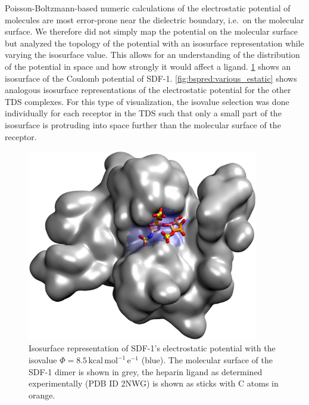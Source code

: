Poisson-Boltzmann-based numeric calculations of the electrostatic potential of
molecules are most error-prone near the dielectric boundary, i.e.\ on the
molecular surface. We therefore did not simply map the potential on the
molecular surface but analyzed the topology of the potential with an isosurface
representation while varying the isosurface value. This allows for an
understanding  of the distribution of the potential in space and how strongly it
would affect a ligand. \cref{fig:bspred:sdf1_estatic} shows an isosurface of the
Coulomb potential of SDF-1. \cref{fig:bspred:various_estatic} shows analogous
isosurface representations of the electrostatic potential for the other TDS
complexes. For this type of visualization, the isovalue selection was done
individually for each receptor in the TDS such that only a small part of the
isosurface is protruding into space further than the molecular surface of the
receptor.



\begin{figure}
\centering
\includegraphics[width=0.9\textwidth]{gfx/bspred/sdf1_isopot_8_5_view1_rotated_jcc_pub_001.jpg}
\caption[]{
Isosurface representation of SDF-1's electrostatic potential with the isovalue
$\Phi = 8.5\,\mathrm{kcal\,mol^{-1}\,e^{-1}}$ (blue). The molecular surface of
the SDF-1 dimer is shown in grey, the heparin ligand as determined
experimentally (PDB ID 2NWG) is shown as sticks with C atoms in orange.
}
\label{fig:bspred:sdf1_estatic}
\end{figure}

